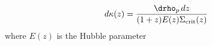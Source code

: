 \begin{equation}
d\kappa(z) = \frac{\drho_p\,dz}{(1+z) E(z) \Sigma_{\rm crit}(z)}
\label{eq:dkappa}
\end{equation}
where $E(z)$ is the Hubble parameter
  